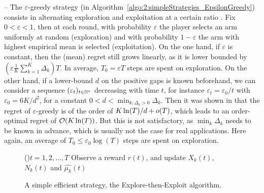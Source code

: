 -- The \textcolor{deeppurple}{$\varepsilon$-greedy strategy} (in Algorithm~\ref{algo:2:simpleStrategies_EpsilonGreedy})
consists in alternating exploration and exploitation at a certain ratio \cite{Auer02}.
Fix $0<\varepsilon<1$, then at each round, with probability $\varepsilon$ the player selects an arm uniformly at random (exploration) and with probability $1-\varepsilon$ the arm with highest empirical mean is selected (exploitation).
On the one hand, if $\varepsilon$ is constant, then the (mean) regret still grows linearly, as it is lower bounded by $(\varepsilon \frac{1}{K} \sum_{k=1}^K \Delta_k) T$.
In average, $T_0 = \varepsilon T$ steps are spent on exploration.
%
On the other hand, if a lower-bound $d$ on the positive gaps is known beforehand,
we can consider a sequence $(\varepsilon_t)_{t\in\mathbb{N}^*}$ decreasing with time $t$, for instance $\varepsilon_t = \varepsilon_0 / t$ with $\varepsilon_0 = 6 K / d^2$, for a constant $0 < d < \min_{k: \Delta_k > 0} \Delta_k$.
Then it was shown in \cite{Auer02} that the regret of $\varepsilon$-greedy is of the order of $K \ln(T) / d + \mathop{}\mathopen{}o\mathopen{}\left(T\right)$, which leads to an order-optimal regret of $\mathop{}\mathopen{}\mathcal{O}\mathopen{}\left(K \ln(T)\right)$.
But this is not satisfactory, as $\min_k \Delta_k$ needs to be known in advance, which is usually not the case for real applications.
Here again, an average of $T_0 \leq \varepsilon_0 \log(T)$ steps are spent on exploration.


\begin{figure}[h!]
	\centering
    \begin{framed}
	\begin{algorithm}[H]
		\For(){$t = 1, 2, \dots, T$}{
            Observe a reward $r(t)$, and update $X_k(t)$, $N_k(t)$ and $\widehat{\mu_k}(t)$
		}
		\caption[A simple efficient strategy, the Explore-then-Exploit algorithm.]{A simple efficient strategy, the \textcolor{deepgold}{Explore-then-Exploit} algorithm.}
		\label{algo:2:simpleStrategies_ExploreThenExploit}
	\end{algorithm}
	\end{framed}
\end{figure}



